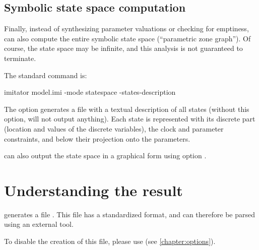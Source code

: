\section{Symbolic state space computation}\label{ss:mode:statespace}

Finally, instead of synthesizing parameter valuations or checking for emptiness,
\imitator{} can also compute the entire symbolic state space (``parametric zone graph'').
Of course, the state space may be infinite, and this analysis is not guaranteed to terminate.

The standard command is:

\begin{terminal}
imitator model.imi -mode statespace -states-description
\end{terminal}

The option  generates a file with a textual description of all states (without this option, \imitator{} will not output anything).
Each state is represented with its discrete part (location and values of the discrete variables), the clock and parameter constraints, and below their projection onto the parameters.

\imitator{} can also output the state space in a graphical form using option .


\chapter{Understanding the \imitator{} result}\label{chapter:result}

\imitator{} generates a file .
This file has a standardized format, and can therefore be parsed using an external tool.

To disable the creation of this file, please use 
(see \cref{chapter:options}).

